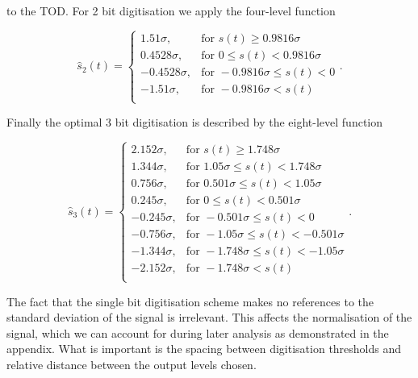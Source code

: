\documentclass[apj]{emulateapj}
\begin{document}
to the TOD. For 2 bit digitisation we apply the four-level function

\begin{equation}  \label{eq:2bit}
\hat{s}_2(t) = \left\{ \begin{array}{rl}
1.51 \sigma, & \text{for } s(t) \geq 0.9816 \sigma\\
0.4528 \sigma, & \text{for } 0 \leq s(t) < 0.9816 \sigma\\
-0.4528 \sigma, & \text{for } -0.9816 \sigma \leq s(t) < 0\\
-1.51 \sigma, & \text{for } -0.9816 \sigma < s(t)\\
\end{array} \right. . \end{equation}

Finally the optimal 3 bit digitisation is described by the eight-level function

\begin{equation}  \label{eq:3bit}
\hat{s}_3(t) = \left\{ \begin{array}{rl}
2.152 \sigma, & \text{for } s(t) \geq 1.748 \sigma\\
1.344 \sigma, & \text{for } 1.05 \sigma \leq s(t) < 1.748 \sigma\\
0.756 \sigma, & \text{for } 0.501 \sigma \leq s(t) < 1.05 \sigma\\
0.245 \sigma, & \text{for } 0 \leq s(t) < 0.501 \sigma\\
-0.245 \sigma, & \text{for } -0.501 \sigma \leq s(t) < 0\\
-0.756 \sigma, & \text{for } -1.05 \sigma \leq s(t) < -0.501 \sigma\\
-1.344 \sigma, & \text{for } -1.748 \sigma \leq s(t) < -1.05 \sigma\\
-2.152 \sigma, & \text{for } -1.748 \sigma < s(t)\\
\end{array} \right. . \end{equation}

The fact that the single bit digitisation scheme makes no references to the standard deviation of the signal is irrelevant. This affects the normalisation of the signal, which we can account for during later analysis as demonstrated in the appendix. What is important is the spacing between digitisation thresholds and relative distance between the output levels chosen.

\end{document}
